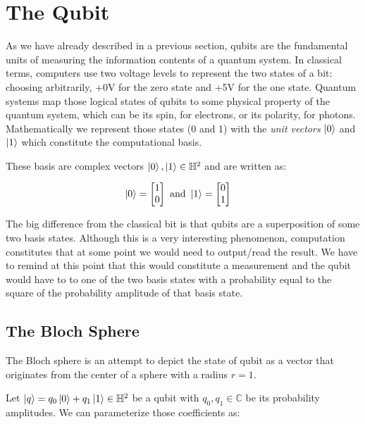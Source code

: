 \section{The Qubit}

As we have already described in a previous section, qubits are the fundamental units of measuring
the information contents of a quantum system. In classical terms, computers use two voltage levels
to represent the two states of a bit: choosing arbitrarily, +0V for the zero state and +5V for the
one state. Quantum systems map those logical states of qubits to some physical property of the quantum
system, which can be its spin, for electrons, or its polarity, for photons. Mathematically we represent
those states (0 and 1) with the \textit{unit vectors} $\ket{0}$ and $\ket{1}$ which constitute the
computational basis.

These basis are complex vectors $\ket{0},\ket{1}\in\mathbb{H}^2$ and are written as:

\begin{align}
    \ket{0}=\begin{bmatrix}
        1\\
        0
    \end{bmatrix}
    \text{ and }
    &
    \ket{1}=\begin{bmatrix}
        0\\
        1
    \end{bmatrix}
\end{align}

The big difference from the classical bit is that qubits are a superposition of some two basis states.
Although this is a very interesting phenomenon, computation constitutes that at some point we would need
to output/read the result. We have to remind at this point that this would constitute a measurement and
the qubit would have to  to one of the two basis states with a probability equal to
the square of the probability amplitude of that basis state.

\subsection{The Bloch Sphere}

The Bloch sphere is an attempt to depict the state of qubit as a vector that originates from the center
of a sphere with a radius $r=1$.

Let $\ket{q}=q_0\ket{0}+q_1\ket{1}\in\mathbb{H}^2$ be a qubit with $q_0,q_1\in\mathbb{C}$ be
its probability amplitudes. We can parameterize those coefficients as:

